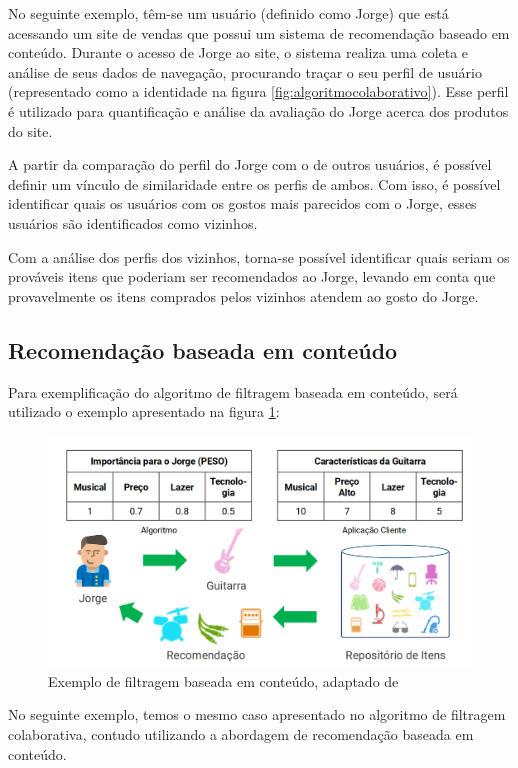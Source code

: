 No seguinte exemplo, têm-se um usuário (definido como Jorge) que está acessando um site de vendas que possui um sistema de recomendação baseado em conteúdo. Durante o acesso de Jorge ao site, o sistema realiza uma coleta e análise de seus dados de navegação, procurando traçar o seu perfil de usuário (representado como a identidade na figura \ref{fig:algoritmocolaborativo}). Esse perfil é utilizado para quantificação e análise da avaliação do Jorge acerca dos produtos do site.

A partir da comparação do perfil do Jorge com o de outros usuários, é possível definir um vínculo de similaridade entre os perfis de ambos. Com isso, é possível identificar quais os usuários com os gostos mais parecidos com o Jorge, esses usuários são identificados como vizinhos.

Com a análise dos perfis dos vizinhos, torna-se possível identificar quais seriam os prováveis itens que poderiam ser recomendados ao Jorge, levando em conta que provavelmente os itens comprados pelos vizinhos atendem ao gosto do Jorge. 

\subsection{Recomendação baseada em conteúdo}

Para exemplificação do algoritmo de filtragem baseada em conteúdo, será utilizado o exemplo apresentado na figura \ref{fig:algoritmoconteudo}:

\begin{figure}[H]
	\centering
	\includegraphics[width=0.7\linewidth]{imagens/baseadoconteudo.png}
	\caption[Exemplo de filtragem baseada em conteúdo]{Exemplo de filtragem baseada em conteúdo, adaptado de \cite{araujo2011apprecommender}}
    \label{fig:algoritmoconteudo}
\end{figure}

No seguinte exemplo, temos o mesmo caso apresentado no algoritmo de filtragem colaborativa, contudo utilizando a abordagem de recomendação baseada em conteúdo.

